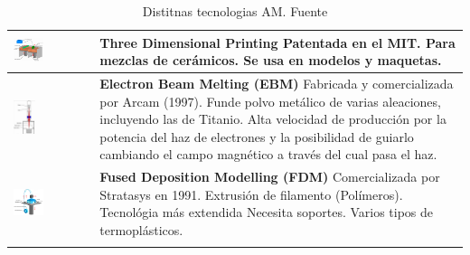 \begin{longtable}{| >{\centering\arraybackslash}m{8cm} | >{\centering\arraybackslash}m{7cm}|}
     \hline
    \centering\includegraphics[width=0.4\textwidth]{./images/3d_mit.png}
    & \textbf{Three Dimensional Printing}
     Patentada en el MIT.
     Para mezclas de cerámicos.
     Se usa en modelos y maquetas.\\[95pt]
    \hline
    \centering\includegraphics[width=0.3\textwidth]{./images/ebm.png}
    & \textbf{Electron Beam Melting (EBM)}
     Fabricada y comercializada por Arcam (1997).
     Funde polvo metálico de varias aleaciones, incluyendo las de Titanio.
     Alta velocidad de producción por la potencia del haz de electrones y la posibilidad de guiarlo cambiando el campo magnético a través del cual pasa el haz.\\[80pt]
    \hline
    \centering\includegraphics[width=0.4\textwidth]{./images/fdm.png}
    & \textbf{Fused Deposition Modelling (FDM)}
     Comercializada por Stratasys en 1991.
     Extrusión de filamento (Polímeros).
     Tecnológia más extendida
     Necesita soportes.
     Varios tipos de termoplásticos.\\[150pt]
     \hline


     \caption{Distitnas tecnologias AM. Fuente \cite{FabricacionAditiva}}
     \label{tab:AM}
\end{longtable}

